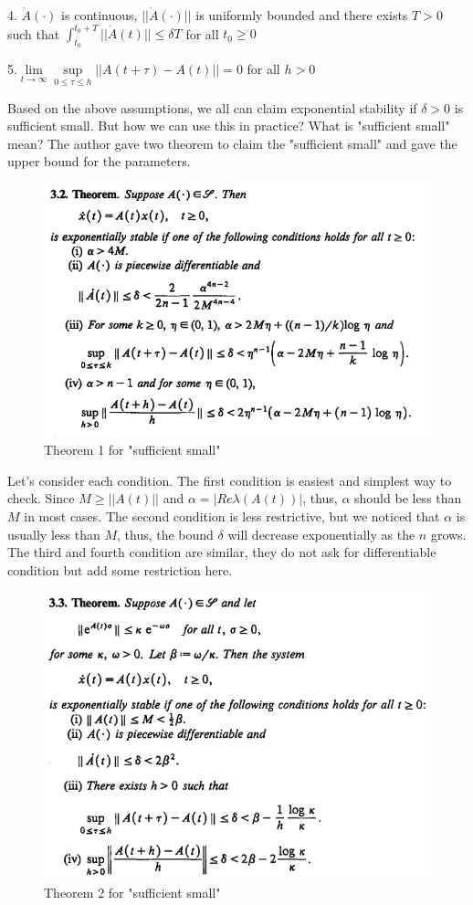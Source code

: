 \documentclass{article}
\begin{document}
4. $\dot{A}(\cdot)$ is continuous, $||\dot{A}(\cdot)||$ is uniformly bounded and there exists $T>0$ such that $\int_{t_0}^{t_0+T} {||\dot{A}(t)||}\leq \delta T$ for all $t_0 \geq 0$

5.$\lim\limits_{t\rightarrow \infty} \sup\limits_{0\leq \tau \leq h}||A(t+\tau)-A(t)|| = 0 $ for all $h>0$

Based on the above assumptions, we all can claim exponential stability if $\delta > 0$ is sufficient small. But how we can use this in practice? What is "sufficient small" mean? The author gave two theorem to claim the "sufficient small" and gave the upper bound for the parameters.

\begin{figure}[H]
\centering
\includegraphics[width=0.5\linewidth]{Ref_2_Theorem_1.png}
\caption{Theorem 1 for "sufficient small"}
\end{figure}

Let's consider each condition. The first condition is easiest and simplest way to check. Since $M \ge ||A(t)||$ and $\alpha = |Re \lambda(A(t))|$, thus, $\alpha$ should be less than $M$ in most cases. The second condition is less restrictive, but we noticed that $\alpha$ is usually less than $M$, thus, the bound $\delta$ will decrease exponentially as the $n$ grows. The third and fourth condition are similar, they do not ask for differentiable condition but add some restriction here.

\begin{figure}[H]
\centering
\includegraphics[width=0.5\linewidth]{Ref_2_Theorem_2.png}
\caption{Theorem 2 for "sufficient small"}
\end{figure}
\end{document}
